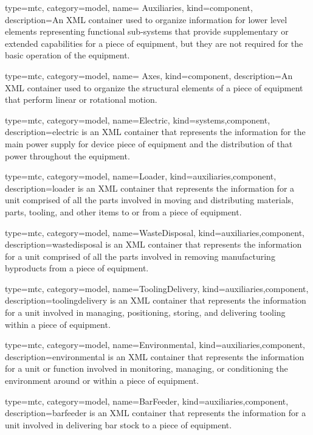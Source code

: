 {
  type=mtc,
  category=model,
  name= {Auxiliaries},
  kind={component},
  description={An XML container used to organize information for \gls{lower level} elements representing functional sub-systems that provide supplementary or extended capabilities for a piece of equipment, but they are not required for the basic operation of the equipment.}
}



{
  type=mtc,
  category=model,
  name= {Axes},
  kind={component},
  description={An XML container used to organize the \glspl{structural element} of a piece of equipment that perform linear or rotational motion.}
}


{
  type=mtc,
  category=model,
  name={Electric},
  kind={systems,component},
  description={\gls{electric} is an XML container that represents the information for the main power supply for device piece of equipment and the distribution of that power throughout the equipment. }
}


{
  type=mtc,
  category=model,
  name={Loader},
  kind={auxiliaries,component},
  description={\gls{loader} is an XML container that represents the information for a unit comprised of all the parts involved in moving and distributing materials, parts, tooling, and other items to or from a piece of equipment.}
}


{
  type=mtc,
  category=model,
  name={WasteDisposal},
  kind={auxiliaries,component},
  description={\gls{wastedisposal} is an XML container that represents the information for a unit comprised of all the parts involved in removing manufacturing byproducts from a piece of equipment.
}
}


{
  type=mtc,
  category=model,
  name={ToolingDelivery},
  kind={auxiliaries,component},
  description={\gls{toolingdelivery} is an XML container that represents the information for a unit involved in managing, positioning, storing, and delivering tooling within a piece of equipment.
}
}


{
  type=mtc,
  category=model,
  name={Environmental},
  kind={auxiliaries,component},
  description={\gls{environmental} is an XML container that represents the information for a unit or function involved in monitoring, managing, or conditioning the environment around or within a piece of equipment.}
}


{
  type=mtc,
  category=model,
  name={BarFeeder},
  kind={auxiliaries,component},
  description={\gls{barfeeder} is an XML container that represents the information for a unit involved in delivering bar stock to a piece of equipment.}
}


